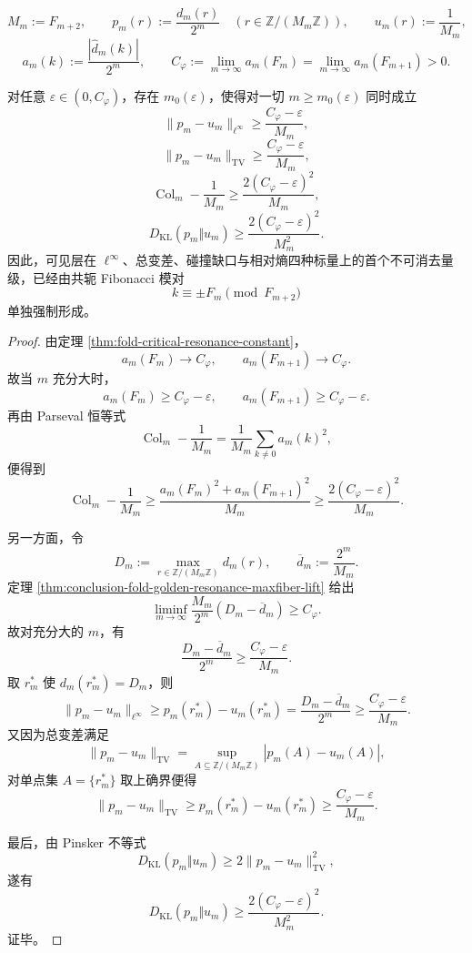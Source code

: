 \[
M_m:=F_{m+2},
\qquad
p_m(r):=\frac{d_m(r)}{2^m}
\quad
\left(r\in \mathbb Z/(M_m\mathbb Z)\right),
\qquad
u_m(r):=\frac1{M_m},
\]
\[
a_m(k):=\frac{|\widehat d_m(k)|}{2^m},
\qquad
C_\varphi:=\lim_{m\to\infty}a_m(F_m)=\lim_{m\to\infty}a_m(F_{m+1})>0.
\]

\begin{theorem}\label{thm:conclusion-fold-singlepair-visible-obstructions}
对任意 \(\varepsilon\in(0,C_\varphi)\)，存在 \(m_0(\varepsilon)\)，使得对一切 \(m\ge m_0(\varepsilon)\) 同时成立
\[
\|p_m-u_m\|_{\ell^\infty}
\ge
\frac{C_\varphi-\varepsilon}{M_m},
\]
\[
\|p_m-u_m\|_{\mathrm{TV}}
\ge
\frac{C_\varphi-\varepsilon}{M_m},
\]
\[
\operatorname{Col}_m-\frac1{M_m}
\ge
\frac{2(C_\varphi-\varepsilon)^2}{M_m},
\]
\[
D_{\mathrm{KL}}(p_m\Vert u_m)
\ge
\frac{2(C_\varphi-\varepsilon)^2}{M_m^2}.
\]
因此，可见层在 \(\ell^\infty\)、总变差、碰撞缺口与相对熵四种标量上的首个不可消去量级，已经由共轭 Fibonacci 模对
\[
k\equiv \pm F_m \pmod{F_{m+2}}
\]
单独强制形成。
\end{theorem}
\begin{proof}
由定理 \ref{thm:fold-critical-resonance-constant}，
\[
a_m(F_m)\to C_\varphi,
\qquad
a_m(F_{m+1})\to C_\varphi.
\]
故当 \(m\) 充分大时，
\[
a_m(F_m)\ge C_\varphi-\varepsilon,
\qquad
a_m(F_{m+1})\ge C_\varphi-\varepsilon.
\]
再由 Parseval 恒等式
\[
\operatorname{Col}_m-\frac1{M_m}
=
\frac1{M_m}\sum_{k\ne 0}a_m(k)^2,
\]
便得到
\[
\operatorname{Col}_m-\frac1{M_m}
\ge
\frac{a_m(F_m)^2+a_m(F_{m+1})^2}{M_m}
\ge
\frac{2(C_\varphi-\varepsilon)^2}{M_m}.
\]

另一方面，令
\[
D_m:=\max_{r\in \mathbb Z/(M_m\mathbb Z)}d_m(r),
\qquad
\overline d_m:=\frac{2^m}{M_m}.
\]
定理 \ref{thm:conclusion-fold-golden-resonance-maxfiber-lift} 给出
\[
\liminf_{m\to\infty}\frac{M_m}{2^m}(D_m-\overline d_m)\ge C_\varphi.
\]
故对充分大的 \(m\)，有
\[
\frac{D_m-\overline d_m}{2^m}\ge \frac{C_\varphi-\varepsilon}{M_m}.
\]
取 \(r_m^\ast\) 使 \(d_m(r_m^\ast)=D_m\)，则
\[
\|p_m-u_m\|_{\ell^\infty}
\ge
p_m(r_m^\ast)-u_m(r_m^\ast)
=
\frac{D_m-\overline d_m}{2^m}
\ge
\frac{C_\varphi-\varepsilon}{M_m}.
\]
又因为总变差满足
\[
\|p_m-u_m\|_{\mathrm{TV}}
=
\sup_{A\subseteq \mathbb Z/(M_m\mathbb Z)}|p_m(A)-u_m(A)|,
\]
对单点集 \(A=\{r_m^\ast\}\) 取上确界便得
\[
\|p_m-u_m\|_{\mathrm{TV}}
\ge
p_m(r_m^\ast)-u_m(r_m^\ast)
\ge
\frac{C_\varphi-\varepsilon}{M_m}.
\]

最后，由 Pinsker 不等式
\[
D_{\mathrm{KL}}(p_m\Vert u_m)\ge 2\|p_m-u_m\|_{\mathrm{TV}}^2,
\]
遂有
\[
D_{\mathrm{KL}}(p_m\Vert u_m)
\ge
\frac{2(C_\varphi-\varepsilon)^2}{M_m^2}.
\]
证毕。
\end{proof}
